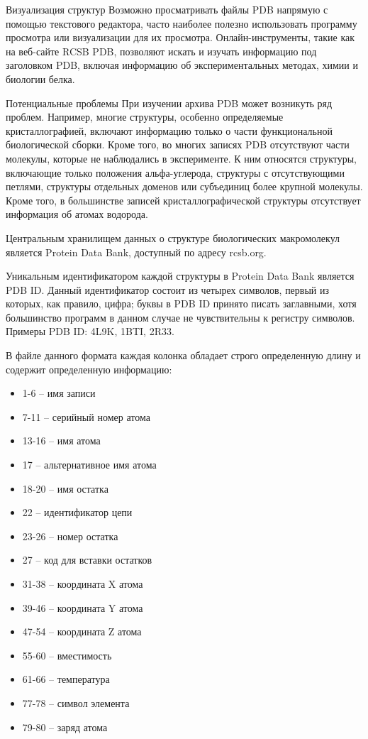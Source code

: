 Визуализация структур
Возможно просматривать файлы PDB напрямую с помощью текстового редактора, часто наиболее полезно использовать программу просмотра или визуализации для их просмотра. Онлайн-инструменты, такие как на веб-сайте RCSB PDB, позволяют искать и изучать информацию под заголовком PDB, включая информацию об экспериментальных методах, химии и биологии белка.

Потенциальные проблемы
При изучении архива PDB может возникуть ряд проблем. Например, многие структуры, особенно определяемые кристаллографией, включают информацию только о части функциональной биологической сборки. Кроме того, во многих записях PDB отсутствуют части молекулы, которые не наблюдались в эксперименте. К ним относятся структуры, включающие только положения альфа-углерода, структуры с отсутствующими петлями, структуры отдельных доменов или субъединиц более крупной молекулы. Кроме того, в большинстве записей кристаллографической структуры отсутствует информация об атомах водорода.

Центральным хранилищем данных о структуре биологических макромолекул является Protein Data Bank, доступный по адресу rcsb.org.

Уникальным идентификатором каждой структуры в Protein Data Bank является PDB ID. Данный идентификатор состоит из четырех символов, первый из которых, как правило, цифра; буквы в PDB ID принято писать заглавными, хотя большинство программ в данном случае не чувствительны к регистру символов. Примеры PDB ID: 4L9K, 1BTI, 2R33.

В файле данного формата каждая колонка обладает строго определенную длину и содержит определенную информацию:

\begin{itemize}
	\item 1-6 -- имя записи
	\item 7-11 -- серийный номер атома
	\item 13-16 -- имя атома
	\item 17 -- альтернативное имя атома
	\item 18-20 -- имя остатка
	\item 22 -- идентификатор цепи
	\item 23-26 -- номер остатка
	\item 27 -- код для вставки остатков
	\item 31-38 -- координата X атома
	\item 39-46 -- координата Y атома
	\item 47-54 -- координата Z атома
	\item 55-60 -- вместимость
	\item 61-66 -- температура
	\item 77-78 -- символ элемента
	\item 79-80 -- заряд атома
\end{itemize}

